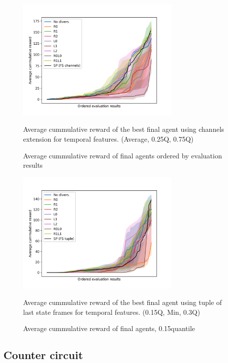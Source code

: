 \begin{figure}[!ht]
    \centering
    \includegraphics*[width=8cm]{../img/CrampedRoomFSChannelsOrdered15Q.png}

    \caption{Average cummulative reward of final agents ordered by evaluation results}
    \label{CrampedRoomFSChannelsOrdered15Q}
    \medskip
    \small 
    Average cummulative reward of the best final agent using channels extension for temporal features.    
    (Average, 0.25Q, 0.75Q)

\end{figure}

\begin{figure}[!ht]
    \centering
    \includegraphics*[width=8cm]{../img/CrampedRoomFSTupleOrdered15Q.png}

    \caption{Average cummulative reward of final agents, 0.15quantile}
    \label{CrampedRoomFSTupleOrdered15Q}
    \medskip
    \small 
    Average cummulative reward of the best final agent using tuple of last state frames for temporal features.
    (0.15Q, Min, 0.3Q)

\end{figure}

\newpage

\subsection{Counter circuit}

